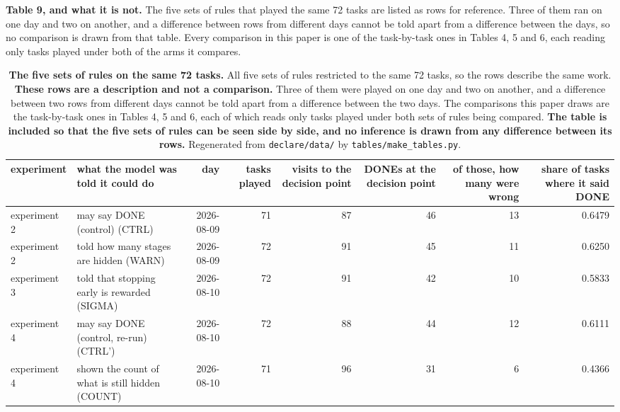 \documentclass[11pt]{article}
\begin{document}
\textbf{Table 9, and what it is not.} The five sets of rules that played the same 72 tasks are listed as rows for reference. Three of them ran on one day and two on another, and a difference between rows from different days cannot be told apart from a difference between the days, so no comparison is drawn from that table. Every comparison in this paper is one of the task-by-task ones in Tables 4, 5 and 6, each reading only tasks played under both of the arms it compares.

\begin{table}[t]
\centering
\scriptsize
\setlength{\tabcolsep}{3.4pt}
\begin{tabularx}{\textwidth}{L{1.102}L{2.753}R{0.983}R{0.551}R{0.735}R{0.735}R{0.551}R{0.59}}
\toprule
\textbf{experiment} & \textbf{what the model was told it could do} & \textbf{day} & \textbf{tasks played} & \textbf{visits to the decision point} & \textbf{DONEs at the decision point} & \textbf{of those, how many were wrong} & \textbf{share of tasks where it said DONE} \\
\midrule
experiment 2 & may say DONE (control) (CTRL) & 2026-08-09 & 71 & 87 & 46 & 13 & 0.6479 \\
experiment 2 & told how many stages are hidden (WARN) & 2026-08-09 & 72 & 91 & 45 & 11 & 0.6250 \\
experiment 3 & told that stopping early is rewarded (SIGMA) & 2026-08-10 & 72 & 91 & 42 & 10 & 0.5833 \\
experiment 4 & may say DONE (control, re-run) (CTRL') & 2026-08-10 & 72 & 88 & 44 & 12 & 0.6111 \\
experiment 4 & shown the count of what is still hidden (COUNT) & 2026-08-10 & 71 & 96 & 31 & 6 & 0.4366 \\
\bottomrule
\end{tabularx}
\caption{\textbf{The five sets of rules on the same 72 tasks.} All five sets of rules restricted to the same 72 tasks, so the rows describe the same work. \textbf{These rows are a description and not a comparison.} Three of them were played on one day and two on another, and a difference between two rows from different days cannot be told apart from a difference between the two days. The comparisons this paper draws are the task-by-task ones in Tables 4, 5 and 6, each of which reads only tasks played under both sets of rules being compared. \textbf{The table is included so that the five sets of rules can be seen side by side, and no inference is drawn from any difference between its rows.} Regenerated from \texttt{declare/data/} by \texttt{tables/make\_tables.py}.}
\label{tab:T9}
\end{table}
\end{document}
